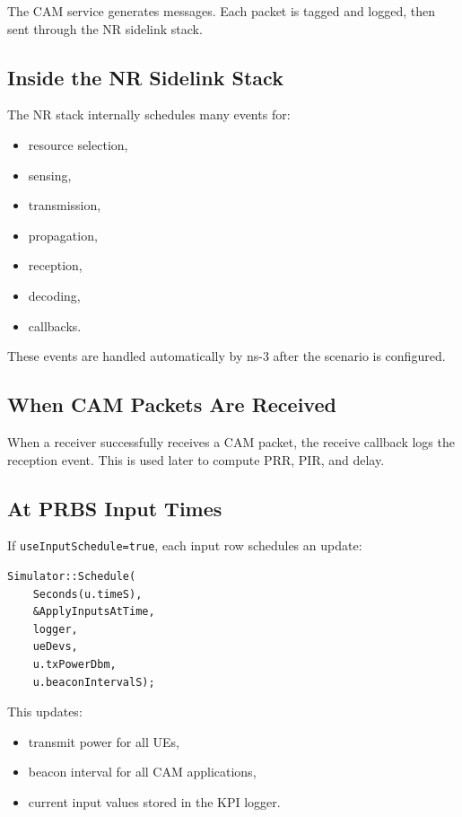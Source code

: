 \documentclass[11pt,a4paper]{article}
\begin{document}
The CAM service generates messages. Each packet is tagged and logged, then sent through the NR sidelink stack.

\subsection{Inside the NR Sidelink Stack}

The NR stack internally schedules many events for:
\begin{itemize}
    \item resource selection,
    \item sensing,
    \item transmission,
    \item propagation,
    \item reception,
    \item decoding,
    \item callbacks.
\end{itemize}

These events are handled automatically by ns-3 after the scenario is configured.

\subsection{When CAM Packets Are Received}

When a receiver successfully receives a CAM packet, the receive callback logs the reception event. This is used later to compute PRR, PIR, and delay.

\subsection{At PRBS Input Times}

If \texttt{useInputSchedule=true}, each input row schedules an update:

\begin{lstlisting}[style=cppstyle]
Simulator::Schedule(
    Seconds(u.timeS),
    &ApplyInputsAtTime,
    logger,
    ueDevs,
    u.txPowerDbm,
    u.beaconIntervalS);
\end{lstlisting}

This updates:
\begin{itemize}
    \item transmit power for all UEs,
    \item beacon interval for all CAM applications,
    \item current input values stored in the KPI logger.
\end{itemize}
\end{document}
